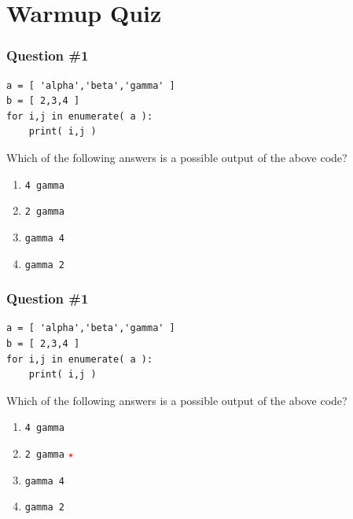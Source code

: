 \documentclass[11pt]{beamer}
\newcommand{\correctstar}{\textcolor{red}{$\star$}}
\begin{document}
\section{Warmup Quiz}

\begin{frame}[fragile]
  \frametitle{Question \#1}
  \Enlarge

  \begin{Verbatim}
a = [ 'alpha','beta','gamma' ]
b = [ 2,3,4 ]
for i,j in enumerate( a ):
    print( i,j )
  \end{Verbatim}

  Which of the following answers is a possible output of the above code?

  \begin{enumerate}[label=\Alph*]
  \item  \texttt{4 gamma}
  \item  \texttt{2 gamma}
  \item  \texttt{gamma 4}
  \item  \texttt{gamma 2}
  \end{enumerate}
\end{frame}

\begin{frame}[fragile]
  \frametitle{Question \#1}
  \Enlarge

  \begin{Verbatim}
a = [ 'alpha','beta','gamma' ]
b = [ 2,3,4 ]
for i,j in enumerate( a ):
    print( i,j )
  \end{Verbatim}

  Which of the following answers is a possible output of the above code?

  \begin{enumerate}[label=\Alph*]
  \item  \texttt{4 gamma}
  \item  \texttt{2 gamma}  \correctstar
  \item  \texttt{gamma 4}
  \item  \texttt{gamma 2}
  \end{enumerate}
\end{frame}
\end{document}
